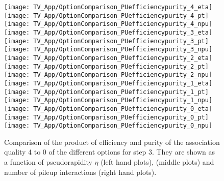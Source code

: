 \begin{figure}[!h]
  \centering
  \texttt{[image: TV\_App/OptionComparison\_PUefficiencypurity\_4\_eta]}
  \texttt{[image: TV\_App/OptionComparison\_PUefficiencypurity\_4\_pt]}
  \texttt{[image: TV\_App/OptionComparison\_PUefficiencypurity\_4\_npu]}
  \\
  \texttt{[image: TV\_App/OptionComparison\_PUefficiencypurity\_3\_eta]}
  \texttt{[image: TV\_App/OptionComparison\_PUefficiencypurity\_3\_pt]}
  \texttt{[image: TV\_App/OptionComparison\_PUefficiencypurity\_3\_npu]}
  \\
  \texttt{[image: TV\_App/OptionComparison\_PUefficiencypurity\_2\_eta]}
  \texttt{[image: TV\_App/OptionComparison\_PUefficiencypurity\_2\_pt]}
  \texttt{[image: TV\_App/OptionComparison\_PUefficiencypurity\_2\_npu]}
  \\
  \texttt{[image: TV\_App/OptionComparison\_PUefficiencypurity\_1\_eta]}
  \texttt{[image: TV\_App/OptionComparison\_PUefficiencypurity\_1\_pt]}
  \texttt{[image: TV\_App/OptionComparison\_PUefficiencypurity\_1\_npu]}
  \\
  \texttt{[image: TV\_App/OptionComparison\_PUefficiencypurity\_0\_eta]}
  \texttt{[image: TV\_App/OptionComparison\_PUefficiencypurity\_0\_pt]}
  \texttt{[image: TV\_App/OptionComparison\_PUefficiencypurity\_0\_npu]}
  \\
\caption[Comparison of the association quality 4 to 0 of the different options for step 3.]{Comparison of the product of efficiency and purity of the association quality 4 to 0 of the different options for step 3. They are shown as a function of pseudorapidity $\eta$ (left hand plots), \pt{} (middle plots) and number of pileup interactions (right hand plots). \label{sec:TrackAss_AppPileup}}
\end{figure}
